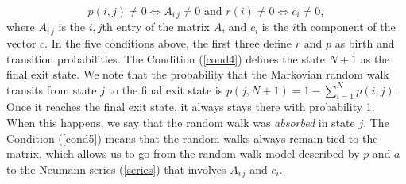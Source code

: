               \begin{equation}\label{cond5}
              p(i,j) \ne 0 \Longleftrightarrow A_{i\,j} \ne 0 \mbox{ and }
              r(i) \ne 0 \Longleftrightarrow c_i \ne 0,
              \end{equation}
        where $A_{i\,j}$ is the $i,j$th entry of the matrix $A$, and $c_i$
        is the $i$th component of the vector $c$.  In the five conditions above,
        the first three define $r$ and $p$ as birth and transition
        probabilities.  The Condition (\ref{cond4}) defines the state $N+1$ as
        the final exit state.  We note that the probability that the
        Markovian random walk transits from state $j$ to the final exit
        state is $p(j,N+1) = 1 - \sum_{i=1}^N p(i,j)$.  Once it reaches
        the final exit state, it always stays there with probability 1.
        When this happens, we say that the random walk was \emph{absorbed}
        in state $j$.  The Condition (\ref{cond5})
        means that the random walks always
        remain tied to the matrix, which allows us to go from the random walk
        model described by $p$ and $a$ to the Neumann series (\ref{series})
        that involves $A_{i\,j}$ and $c_i$.
        

